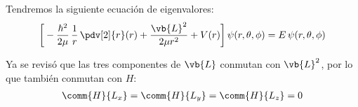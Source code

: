 

Tendremos la siguiente ecuación de eigenvalores:
\begin{align}
\bigg[ - \dfrac{\hbar^{2}}{2 \mu} \, \dfrac{1}{r} \, \pdv[2]{r} (r) + \dfrac{\vb{L}^{2}}{2 \mu r^{2}} + V (r) \bigg] \, \psi (r, \theta, \phi) = E \, \psi (r, \theta, \phi) 
\label{eq:ecuacion_08_01_02}
\end{align}

Ya se revisó que las tres componentes de $\vb{L}$ conmutan con $\vb{L}^{2}$, por lo que también conmutan con $H$:
\begin{align}
\comm{H}{L_{x}} = \comm{H}{L_{y}} = \comm{H}{L_{z}} = 0
\label{eq:ecuacion_08_04}
\end{align}

